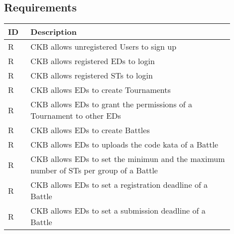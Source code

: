 \subsection{Requirements}
\label{subsec:requirements3}%
\setcounter{req}{1}
\newcommand{\creq}{\thereq\stepcounter{req}}
\begin{center}
    \begin{longtable}{|l|p{0.9\linewidth}|}
        \hline
        \textbf{ID} & \textbf{Description}                                                                                                                             \\
        \hline
        R\creq      & CKB allows unregistered Users to sign up                                                                    \\
        \hline
        R\creq      & CKB allows registered EDs to login                                                                    \\
        \hline
        R\creq      & CKB allows registered STs to login                                                                    \\
        \hline
        R\creq      & CKB allows EDs to create Tournaments                                                                    \\
        \hline
        R\creq      & CKB allows EDs to grant the permissions of a Tournament to other EDs                                                                 \\
        \hline
        R\creq      & CKB allows EDs to create Battles                                                                    \\
        \hline
        R\creq      & CKB allows EDs to uploads the code kata of a Battle                                                                   \\
        \hline
        R\creq      & CKB allows EDs to set the minimun and the maximum number of STs per group of a Battle                                                            \\
        \hline
        R\creq      & CKB allows EDs to set a registration deadline of a Battle                                                                 \\
        \hline
        R\creq      & CKB allows EDs to set a submission deadline of a Battle                                                                \\

\end{longtable}
\end{center}
